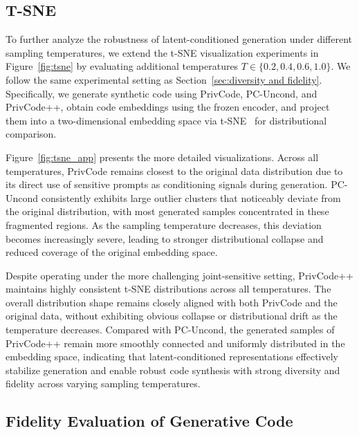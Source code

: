 \documentclass{article}
\theoremstyle{plain}
\theoremstyle{definition}
\theoremstyle{remark}
\def \toolname{PrivCode++}
\begin{document}
{\subsection{T-SNE}
\label{app:t-SNE}

To further analyze the robustness of latent-conditioned generation under different sampling temperatures, we extend the t-SNE visualization experiments in Figure~\ref{fig:tsne} by evaluating additional temperatures $T \in \{0.2, 0.4, 0.6, 1.0\}$. We follow the same experimental setting as Section~\ref{sec:diversity and fidelity}. Specifically, we generate synthetic code using PrivCode, PC-Uncond, and \toolname{}, obtain code embeddings using the frozen encoder, and project them into a two-dimensional embedding space via t-SNE~\cite{van2008visualizing} for distributional comparison. 


Figure~\ref{fig:tsne_app} presents the more detailed visualizations. Across all temperatures, PrivCode remains closest to the original data distribution due to its direct use of sensitive prompts as conditioning signals during generation. PC-Uncond consistently exhibits large outlier clusters that noticeably deviate from the original distribution, with most generated samples concentrated in these fragmented regions. As the sampling temperature decreases, this deviation becomes increasingly severe, leading to stronger distributional collapse and reduced coverage of the original embedding space. 


Despite operating under the more challenging joint-sensitive setting, \toolname{} maintains highly consistent t-SNE distributions across all temperatures. The overall distribution shape remains closely aligned with both PrivCode and the original data, without exhibiting obvious collapse or distributional drift as the temperature decreases. Compared with PC-Uncond, the generated samples of \toolname{} remain more smoothly connected and uniformly distributed in the embedding space, indicating that latent-conditioned representations effectively stabilize generation and enable robust code synthesis with strong diversity and fidelity across varying sampling temperatures.









\subsection{Fidelity Evaluation of Generative Code}
\label{app:fidelity}





}
\end{document}
